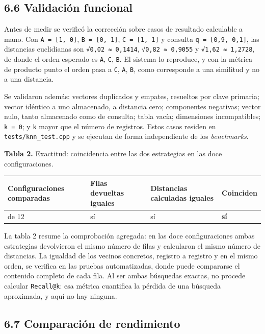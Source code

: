 \documentclass[11pt,a4paper]{article}
\let\pandocsubsection\subsection
\let\subsection\section
\let\subsubsection\pandocsubsection
\begin{document}
\subsubsection{6.6 Validación
funcional}\label{66-validaciuxf3n-funcional}

Antes de medir se verificó la corrección sobre casos de resultado
calculable a mano. Con \texttt{A\ =\ {[}1,\ 0{]}},
\texttt{B\ =\ {[}0,\ 1{]}}, \texttt{C\ =\ {[}1,\ 1{]}} y consulta
\texttt{q\ =\ {[}0,9,\ 0,1{]}}, las distancias euclidianas son
\texttt{√0,02\ ≈\ 0,1414}, \texttt{√0,82\ ≈\ 0,9055} y
\texttt{√1,62\ ≈\ 1,2728}, de donde el orden esperado es \texttt{A},
\texttt{C}, \texttt{B}. El sistema lo reproduce, y con la métrica de
producto punto el orden pasa a \texttt{C}, \texttt{A}, \texttt{B}, como
corresponde a una similitud y no a una distancia.

Se validaron además: vectores duplicados y empates, resueltos por clave
primaria; vector idéntico a uno almacenado, a distancia cero;
componentes negativas; vector nulo, tanto almacenado como de consulta;
tabla vacía; dimensiones incompatibles; \texttt{k\ =\ 0}; y \texttt{k}
mayor que el número de registros. Estos casos residen en
\texttt{tests/knn\_test.cpp} y se ejecutan de forma independiente de los
\emph{benchmarks}.

\textbf{Tabla 2.} Exactitud: coincidencia entre las dos estrategias en
las doce configuraciones.

\begin{longtable}[]{@{}C{0.22\textwidth}C{0.20\textwidth}C{0.27\textwidth}C{0.15\textwidth}@{}}
\toprule\noalign{}
Configuraciones comparadas & Filas devueltas iguales & Distancias
calculadas iguales & Coinciden \\
\midrule\noalign{}
\endhead
\bottomrule\noalign{}
 de 12 & sí & sí & \textbf{sí} \\
\end{longtable}

La tabla 2 resume la comprobación agregada: en las doce configuraciones
ambas estrategias devolvieron el mismo número de filas y calcularon el
mismo número de distancias. La igualdad de los vecinos concretos,
registro a registro y en el mismo orden, se verifica en las pruebas
automatizadas, donde puede compararse el contenido completo de cada
fila. Al ser ambas búsquedas exactas, no procede calcular
\texttt{Recall@k}: esa métrica cuantifica la pérdida de una búsqueda
aproximada, y aquí no hay ninguna.

\subsubsection{6.7 Comparación de
rendimiento}\label{67-comparaciuxf3n-de-rendimiento}
\end{document}
